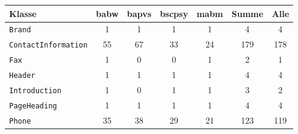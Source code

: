     \begin{table}[htb]
        \centering
        \begin{tabular}{|l|c|c|c|c|c|c|}
        \hline
            \textbf{Klasse}  & \multicolumn{1}{l|}{\textbf{\gls{babw}}} & \multicolumn{1}{l|}{\textbf{\gls{bapvs}}} & \multicolumn{1}{l|}{\textbf{\gls{bscpsy}}} & \multicolumn{1}{l|}{\textbf{\gls{mabm}}} & \multicolumn{1}{l|}{\textbf{Summe}} & \multicolumn{1}{l|}{\textbf{Alle}} \\ \hline
            \texttt{Brand}              & 1                                  & 1                                   & 1                                    & 1                                  & 4                                   & 4                                  \\ \hline
            \texttt{ContactInformation} & 55                                 & 67                                  & 33                                   & 24                                 & 179                                 & 178                                \\ \hline
            \texttt{Fax}                & 1                                  & 0                                   & 0                                    & 1                                  & 2                                   & 1                                  \\ \hline
            \texttt{Header}             & 1                                  & 1                                   & 1                                    & 1                                  & 4                                   & 4                                  \\ \hline
            \texttt{Introduction}       & 1                                  & 0                                   & 1                                    & 1                                  & 3                                   & 2                                  \\ \hline
            \texttt{PageHeading}        & 1                                  & 1                                   & 1                                    & 1                                  & 4                                   & 4                                  \\ \hline
            \texttt{Phone}              & 35                                 & 38                                  & 29                                   & 21                                 & 123                                 & 119                                \\ \hline

\end{tabular}
\end{table}
